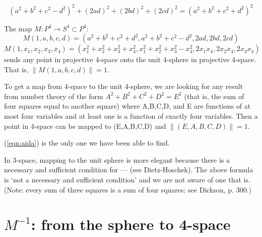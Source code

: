 \begin{lemma}
\begin{equation}
\label{eqn:aida}
(a^2 + b^2 + c^2 - d^2)^2 + (2ad)^2 + (2bd)^2 + (2cd)^2 = 
(a^2 + b^2 + c^2 + d^2)^2
\end{equation}
\end{lemma}
\prf
\QED


\begin{corollary}
The map $M:P^4 \rightarrow S^4 \subset P^4$:
\begin{equation}
\label{eq:M}
	M(1,a,b,c,d) = (a^2+b^2+c^2+d^2,a^2+b^2+c^2-d^2,2ad,2bd,2cd)
\end{equation}
\begin{equation}
	M(1,x_1,x_2,x_3,x_4) = (x_1^2+x_2^2+x_3^2+x_4^2,x_1^2+x_2^2+x_3^2-x_4^2,
				2x_1x_4,2x_2x_4,2x_3x_4)
\end{equation}
sends any point in projective 4-space onto the unit 4-sphere in projective
4-space.
That is, $\| M(1,a,b,c,d) \| = 1$.
\end{corollary}
\prf
\QED

\begin{rmk}
To get a map from 4-space to the unit 4-sphere,
we are looking for any result from number theory 
of the form $A^2+B^2+C^2+D^2=E^2$
(that is, the sum of four squares equal to another square)
where A,B,C,D, and E are functions of at most four variables
and at least one is a function of exactly four variables.
Then a point in 4-space can be
mapped to (E,A,B,C,D) and $\|(E,A,B,C,D)\| = 1$.

(\ref{eqn:aida}) is the only one we have been able to find.
\end{rmk}

\begin{rmk}
In 3-space, mapping to the unit sphere is more elegant because
there is a necessary and sufficient condition for --- (see Dietz-Hoschek).
The above formula is `not a necessary and sufficient condition'
and we are not aware of one that is.
(Note: every sum of three squares is a sum of four squares:
see Dickson, p. 300.)
\end{rmk}

\section{$M^{-1}$: from the sphere to 4-space}

